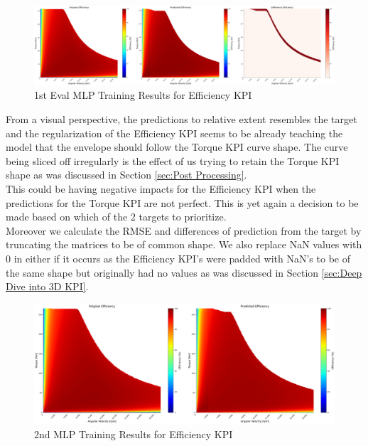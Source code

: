 \documentclass{report} %
\begin{document}
\begin{figure}[H]
    \centering
    \includegraphics[width=1\textwidth]{./ReportImages/evalKPI3Dprediction1.png} 
    \caption{1st Eval MLP Training Results for Efficiency \ac{KPI}} 
    \label{fig:1st Eval MLP Training Results for 3D KPI(Efficiency)}
\end{figure}

From a visual perspective, the predictions to relative extent resembles the target and the regularization of the Efficiency \ac{KPI} seems to be already teaching the model that the envelope should follow the Torque \ac{KPI} curve shape.  
The curve being sliced off irregularly is the effect of us trying to retain the Torque \ac{KPI} shape as was discussed in Section \ref{sec:Post Processing}.\\
This could be having negative impacts for the Efficiency \ac{KPI}  when the predictions for the Torque \ac{KPI} are not perfect.
This is yet again a decision to be made based on which of the 2 targets to prioritize. \\

Moreover we calculate the RMSE and differences of prediction from the target by truncating the matrices to be of common shape.
We also replace \ac{NaN} values with 0 in either if it occurs as the Efficiency \ac{KPI}'s were padded with \ac{NaN}'s to be of the same shape but originally had no values as was discussed in Section \ref{sec:Deep Dive into 3D KPI}.\\

\begin{figure}[H]
    \centering
    \includegraphics[width=1\textwidth]{./ReportImages/KPI3Dprediction2.png} 
    \caption{2nd MLP Training Results for Efficiency \ac{KPI}} 
    \label{fig:2nd MLP Training Results for 3D KPI(Efficiency)}
\end{figure}
\end{document}
